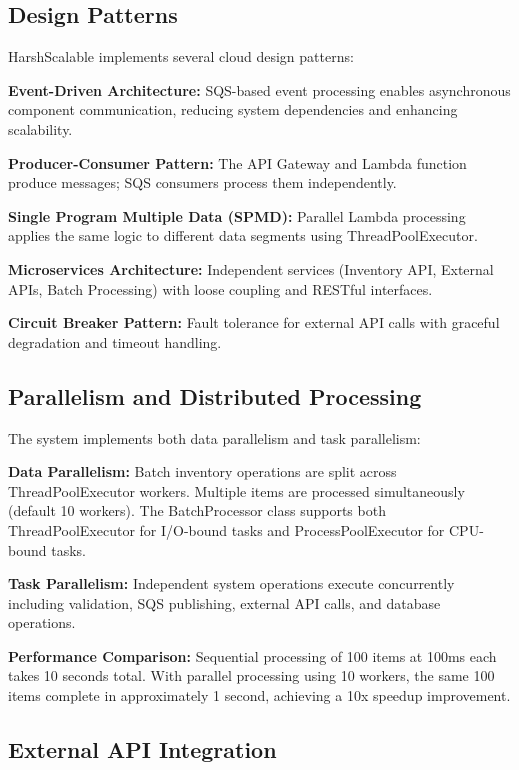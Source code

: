 \documentclass[conference]{IEEEtran}
\begin{document}
\subsection{Design Patterns}

HarshScalable implements several cloud design patterns:

\textbf{Event-Driven Architecture:} SQS-based event processing enables asynchronous component communication, reducing system dependencies and enhancing scalability.

\textbf{Producer-Consumer Pattern:} The API Gateway and Lambda function produce messages; SQS consumers process them independently.

\textbf{Single Program Multiple Data (SPMD):} Parallel Lambda processing applies the same logic to different data segments using ThreadPoolExecutor.

\textbf{Microservices Architecture:} Independent services (Inventory API, External APIs, Batch Processing) with loose coupling and RESTful interfaces.

\textbf{Circuit Breaker Pattern:} Fault tolerance for external API calls with graceful degradation and timeout handling.

\subsection{Parallelism and Distributed Processing}

The system implements both data parallelism and task parallelism:

\textbf{Data Parallelism:} Batch inventory operations are split across ThreadPoolExecutor workers. Multiple items are processed simultaneously (default 10 workers). The BatchProcessor class supports both ThreadPoolExecutor for I/O-bound tasks and ProcessPoolExecutor for CPU-bound tasks.

\textbf{Task Parallelism:} Independent system operations execute concurrently including validation, SQS publishing, external API calls, and database operations.

\textbf{Performance Comparison:} Sequential processing of 100 items at 100ms each takes 10 seconds total. With parallel processing using 10 workers, the same 100 items complete in approximately 1 second, achieving a 10x speedup improvement.

\subsection{External API Integration}
\end{document}
